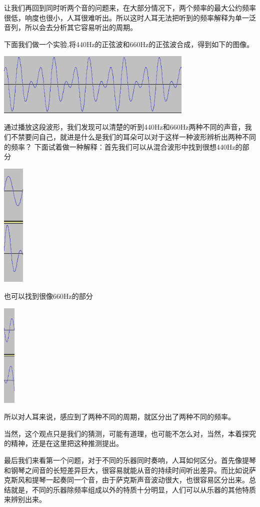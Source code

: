 \par
让我们再回到同时听两个音的问题来，在大部分情况下，两个频率的最大公约频率很低，响度也很小，人耳很难听出。所以这时人耳无法把听到的频率解释为单一泛音列，所以会去分析其它容易听出的周期。
\par
下面我们做一个实验,将440Hz的正弦波和660Hz的正弦波合成，得到如下的图像。
\vspace{1cm}
\begin{center}
    \includegraphics[height=3cm]{mix.png}
\end{center}
\vspace{1cm}
通过播放这段波形，我们发现可以清楚的听到440Hz和660Hz两种不同的声音，我们不禁要问自己，就进是什么是我们的耳朵可以对于这样一种波形辨析出两种不同的频率？
下面试着做一种解释：首先我们可以从混合波形中找到很想440Hz的部分
\begin{center}
    \includegraphics[height=6cm]{440.png}
\end{center}
也可以找到很像660Hz的部分
\begin{center}
    \includegraphics[height=5cm]{660.png}
\end{center}
所以对人耳来说，感应到了两种不同的周期，就区分出了两种不同的频率。
\par
当然，这个观点只是我们的猜测，可能有道理，也可能不怎么对，当然，本着探究的精神，还是在这里把这种推测提出。
\par
最后我们来看第一个问题，对于不同的乐器同时奏响，人耳如何区分。首先像提琴和钢琴之间音的长短差异巨大，很容易就能从音的持续时间听出差异。而比如说萨克斯风和提琴一起奏同一个音，由于萨克斯声音波动很大，也很容易区分出来。总结就是，不同的乐器除频率组成以外的特质十分明显，人们可以从乐器的其他特质来辨别出来。
